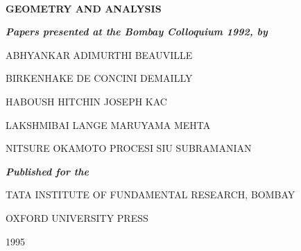 \vfill\eject


\thispagestyle{empty}

~

\begin{center}
{\Large\bf  GEOMETRY AND ANALYSIS}
\medskip
\end{center}

\vskip 1cm

\begin{center}
{\textit\bfseries Papers presented at the Bombay Colloquium 1992, by}
\end{center}

\smallskip

\begin{center}
ABHYANKAR ADIMURTHI BEAUVILLE

BIRKENHAKE DE CONCINI DEMAILLY

HABOUSH HITCHIN JOSEPH KAC

LAKSHMIBAI LANGE MARUYAMA MEHTA

NITSURE OKAMOTO PROCESI SIU SUBRAMANIAN



\vfill

{\bf \it Published for the}
\medskip

\textsc{TATA INSTITUTE OF FUNDAMENTAL RESEARCH, BOMBAY}

\medskip

{\large OXFORD UNIVERSITY PRESS}

\smallskip

{1995}
\end{center}


\newpage

~\phantom{a}

\thispagestyle{empty}


